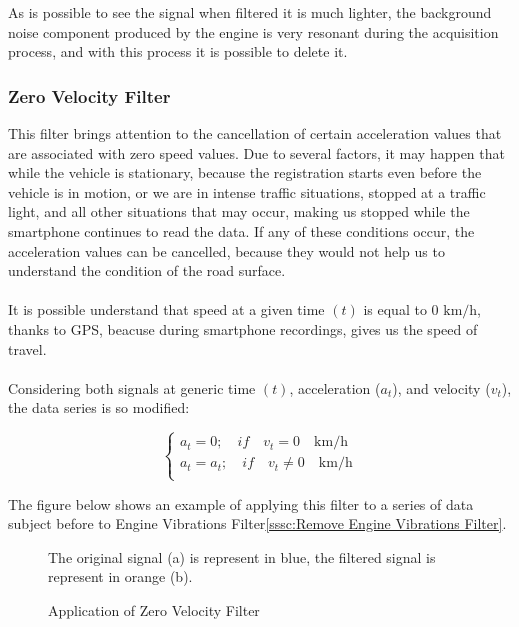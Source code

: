 \documentclass[tesi]{subfiles}
\begin{document}
\noindent As is possible to see the signal when filtered it is much lighter, the background noise component produced by the engine is very resonant during the acquisition process, and with this process it is possible to delete it.
\clearpage
\subsubsection{Zero Velocity Filter}\label{sssc:Zero Velocity Filter}
This filter brings attention to the cancellation of certain acceleration values that are associated with zero speed values. Due to several factors, it may happen that while the vehicle is stationary,  because the registration starts even before the vehicle is in motion, or we are in intense traffic situations, stopped at a traffic light, and all other situations that may occur, making us stopped while the smartphone continues to read the data. If any of these conditions occur, the acceleration values can be cancelled, because they would not help us to understand the condition of the road surface.\\\\ \noindent It is possible understand that speed at a given time $(t)$ is equal to $0$ $\si{\km\per\hour}$, thanks to GPS, beacuse during smartphone recordings, gives us the speed of travel.\\\\
\noindent Considering both signals at generic time $(t)$, acceleration ($a_{t}$), and velocity ($v_{t}$), the data series is so modified:
\begin{center}
\[
    \left\{
                \begin{array}{ll}
                  a_{t} = 0; \quad 	if \quad v_{t} = 0 \quad \si{\km\per\hour}\\
                  a_{t} = a_{t}; \quad 	if \quad v_{t} \neq 0 \quad \si{\km\per\hour}\\
                \end{array}
              \right.
\]
\end{center}

\noindent The figure below shows an example of applying this filter to a series of data subject before to Engine Vibrations Filter\ref{sssc:Remove Engine Vibrations Filter}.

\begin{figure}[H]	

\centering
{}

The original signal (a) is represent in blue, the filtered signal is represent in orange (b).

 \caption{Application of Zero Velocity Filter}
  \label{fig:Application of Zero Velocity Filter.}
\end{figure}
\clearpage
\end{document}
